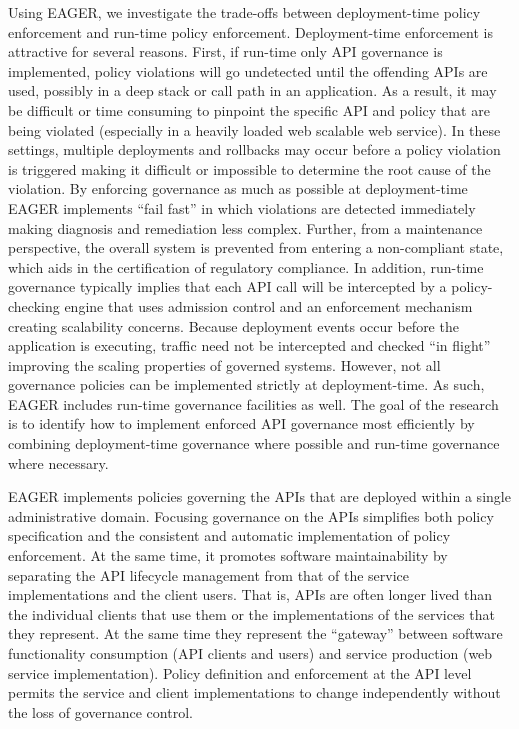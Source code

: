 Using EAGER, we investigate the trade-offs between deployment-time policy
enforcement and run-time policy enforcement.
Deployment-time enforcement is attractive for several
reasons.  First, if run-time only API governance is implemented, 
policy violations will go undetected until the offending APIs are used,
possibly in a deep stack or call path in an application.  
As a result, it may be difficult or time consuming to pinpoint the specific
API and policy that are being violated (especially in a heavily loaded web
scalable web service).
In these settings, multiple deployments and rollbacks may occur before a policy
violation is triggered making it difficult or impossible to determine the root
cause of the violation.  By enforcing governance as much as possible
at deployment-time
EAGER implements ``fail fast'' in which violations are detected
immediately making diagnosis and remediation less complex.  
Further, from a maintenance perspective,  the overall
system is prevented from entering a non-compliant state, which aids in the
certification of regulatory compliance.  In addition, run-time governance
typically implies that each API call will be intercepted by a policy-checking engine
that uses admission control and an enforcement mechanism creating scalability
concerns.  Because deployment
events occur before the application is executing,
traffic need not be intercepted and checked ``in flight''
improving the
scaling properties of governed systems.  However, not all governance policies can be
implemented strictly at deployment-time.  As such, EAGER includes run-time
governance facilities as well.  The goal of the research is to identify how to
implement enforced API governance most efficiently by combining deployment-time  
governance where possible and run-time governance where necessary.


EAGER implements policies governing the APIs that are 
deployed within a single administrative domain.  Focusing governance on
the APIs simplifies both policy specification and the consistent
and automatic implementation of policy enforcement.  At the same time, it promotes
software maintainability by separating the API lifecycle management from that
of the service implementations and the client users.  That is, APIs are often
longer lived than the individual clients that use them or the implementations
of the services that they represent.  At the same time they represent the
``gateway'' between software functionality consumption 
(API clients and users) and service
production (web service implementation).  Policy definition and enforcement at
the API level permits the service and client implementations to change
independently without the loss of governance control.

